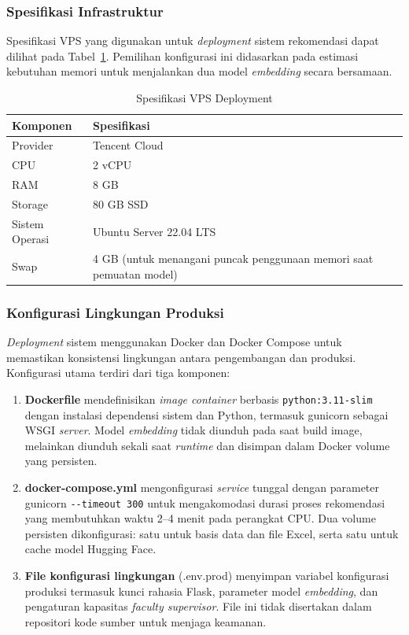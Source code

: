 \subsubsection{Spesifikasi Infrastruktur}\label{spesifikasi-infrastruktur-deployment}

Spesifikasi VPS yang digunakan untuk \textit{deployment} sistem rekomendasi dapat dilihat pada Tabel~\ref{table:vps_spec}. Pemilihan konfigurasi ini didasarkan pada estimasi kebutuhan memori untuk menjalankan dua model \textit{embedding} secara bersamaan.

\begin{table}[H]
\centering
\caption{Spesifikasi VPS Deployment}
\label{table:vps_spec}
\begin{tabular}{|p{4cm}|p{9cm}|}
\hline
\textbf{Komponen} & \textbf{Spesifikasi} \\ \hline
Provider & Tencent Cloud \\ \hline
CPU & 2 vCPU \\ \hline
RAM & 8 GB \\ \hline
Storage & 80 GB SSD \\ \hline
Sistem Operasi & Ubuntu Server 22.04 LTS \\ \hline
Swap & 4 GB (untuk menangani puncak penggunaan memori saat pemuatan model) \\ \hline
\end{tabular}
\end{table}

\subsubsection{Konfigurasi Lingkungan Produksi}\label{konfigurasi-lingkungan-produksi}

\textit{Deployment} sistem menggunakan Docker dan Docker Compose untuk memastikan konsistensi lingkungan antara pengembangan dan produksi. Konfigurasi utama terdiri dari tiga komponen:

\begin{enumerate}
\def\labelenumi{\arabic{enumi}.}
\item
  \textbf{Dockerfile} mendefinisikan \textit{image container} berbasis \texttt{python:3.11-slim} dengan instalasi dependensi sistem dan Python, termasuk gunicorn sebagai WSGI \textit{server}. Model \textit{embedding} tidak diunduh pada saat build image, melainkan diunduh sekali saat \textit{runtime} dan disimpan dalam Docker volume yang persisten.
\item
  \textbf{docker-compose.yml} mengonfigurasi \textit{service} tunggal dengan parameter gunicorn \texttt{-{}-timeout 300} untuk mengakomodasi durasi proses rekomendasi yang membutuhkan waktu 2–4 menit pada perangkat CPU. Dua volume persisten dikonfigurasi: satu untuk basis data dan file Excel, serta satu untuk cache model Hugging Face.
\item
  \textbf{File konfigurasi lingkungan} (.env.prod) menyimpan variabel konfigurasi produksi termasuk kunci rahasia Flask, parameter model \textit{embedding}, dan pengaturan kapasitas \textit{faculty supervisor}. File ini tidak disertakan dalam repositori kode sumber untuk menjaga keamanan.
\end{enumerate}


